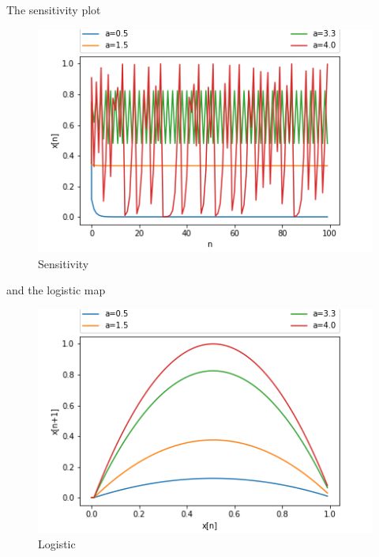 \documentclass[a4paper,10pt]{article}
\begin{document}
\newpage
The sensitivity plot
\begin{figure}[h!]
	\centering
	\includegraphics[width=0.7\linewidth]{sensitivity}
	\caption{Sensitivity}
	\label{fig:sensitivity}
\end{figure}

and the logistic map
\begin{figure}[h!]
	\centering
	\includegraphics[width=0.7\linewidth]{logistic}
	\caption{Logistic}
	\label{fig:logistic}
\end{figure}
\end{document}
